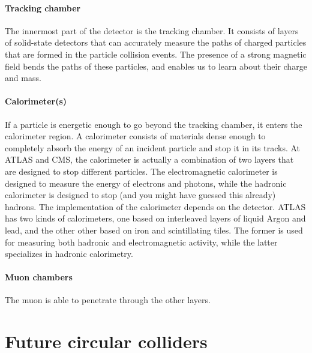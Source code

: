 \paragraph{Tracking chamber}
The innermost part of the detector is the tracking chamber. It consists of layers of solid-state detectors that can accurately measure the paths of charged particles that are formed in the particle collision events. The presence of a strong magnetic field bends the paths of these particles, and enables us to learn about their charge and mass.
\paragraph{Calorimeter(s)}
If a particle is energetic enough to go beyond the tracking chamber, it enters the calorimeter region. A calorimeter consists of materials dense enough to completely absorb the energy of an incident particle and stop it in its tracks. At ATLAS and CMS, the calorimeter is actually a combination of two layers that are designed to stop different particles. The electromagnetic calorimeter is designed to measure the energy of electrons and photons, while the hadronic calorimeter is designed to stop (and you might have guessed this already) hadrons. The implementation of the calorimeter depends on the detector. ATLAS has two kinds of calorimeters, one based on interleaved layers of liquid Argon and lead, and the other other based on iron and scintillating tiles. The former is used for measuring both hadronic and electromagnetic activity, while the latter specializes in hadronic calorimetry. 
\paragraph{Muon chambers} The muon is able to penetrate through the other layers.

\section{Future circular colliders}


